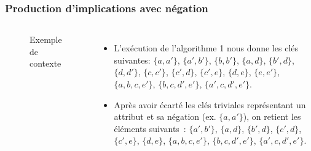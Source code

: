 \documentclass[french]{beamer}
\begin{document}
\begin{frame}
\frametitle{Production d'implications avec négation}
\begin{columns}[t] %
\begin{figure}[h]
\label{cap:fig:negctx}
\begin{center}
\begin{cxt}%
\cxtName{}%
%
%
%
%
%
\end{cxt}
\end{center}
\caption{Exemple de contexte \context}
\end{figure}
\begin{itemize}
\item L'exécution de l'algorithme 1 nous donne les clés suivantes: $\{a, a'\}$, $\{a', b'\}$, $\{b, b'\}$, $\{a, d\}$, $\{b', d\}$, $\{d, d'\}$, $\{c, c'\}$, $\{c', d\}$, $\{c', e\}$, $\{d, e\}$, $\{e, e'\}$, $\{a, b, c, e'\}$, $\{b, c, d', e'\}$, $\{a', c, d', e'\}$.
\item Après avoir écarté les clés triviales représentant un attribut et sa négation (ex. $\{a, a'\}$), on retient les éléments suivants~: $\{a', b'\}$, $\{a, d\}$, $\{b', d\}$, $\{c', d\}$, $\{c', e\}$, $\{d, e\}$, $\{a, b, c, e'\}$, $\{b, c, d', e'\}$, $\{a', c, d', e'\}$.
\end{itemize}
\end{columns}
\end{frame}
\end{document}
